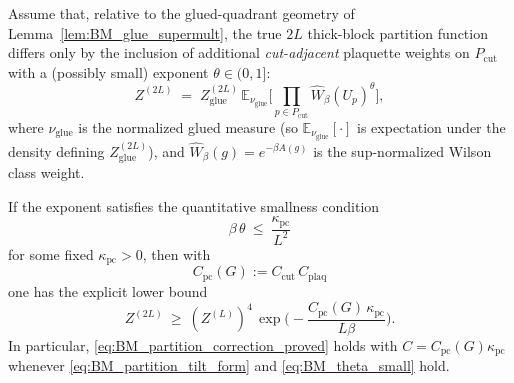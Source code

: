 \begin{proposition}\label{prop:BM_partition_correction}
Assume that, relative to the glued-quadrant geometry of Lemma~\ref{lem:BM_glue_supermult}, the true $2L$ thick-block partition function differs
only by the inclusion of additional \emph{cut-adjacent} plaquette weights on $P_{\mathrm{cut}}$ with a (possibly small) exponent $\theta\in(0,1]$:
\begin{equation}\label{eq:BM_partition_tilt_form}
Z^{(2L)} \;=\; Z_{\mathrm{glue}}^{(2L)}\,
\mathbb E_{\nu_{\mathrm{glue}}}\Big[\prod_{p\in P_{\mathrm{cut}}}\widehat W_\beta(U_p)^{\theta}\Big],
\end{equation}
where $\nu_{\mathrm{glue}}$ is the normalized glued measure (so $\mathbb E_{\nu_{\mathrm{glue}}}[\cdot]$ is expectation under the density defining
$Z_{\mathrm{glue}}^{(2L)}$), and $\widehat W_\beta(g)=e^{-\beta A(g)}$ is the sup-normalized Wilson class weight.

If the exponent satisfies the quantitative smallness condition
\begin{equation}\label{eq:BM_theta_small}
\beta\,\theta \ \le\ \frac{\kappa_{\mathrm{pc}}}{L^2}
\end{equation}
for some fixed $\kappa_{\mathrm{pc}}>0$, then with
\begin{equation}\label{eq:BM_Cpc_def}
C_{\mathrm{pc}}(G):=C_{\mathrm{cut}}\,C_{\mathrm{plaq}}
\end{equation}
one has the explicit lower bound
\begin{equation}\label{eq:BM_partition_correction_proved}
Z^{(2L)}\ \ge\ (Z^{(L)})^4\,\exp\!\Big(-\frac{C_{\mathrm{pc}}(G)\,\kappa_{\mathrm{pc}}}{L\beta}\Big).
\end{equation}
In particular, \eqref{eq:BM_partition_correction_proved} holds with $C=C_{\mathrm{pc}}(G)\kappa_{\mathrm{pc}}$ whenever \eqref{eq:BM_partition_tilt_form} and
\eqref{eq:BM_theta_small} hold.
\end{proposition}
